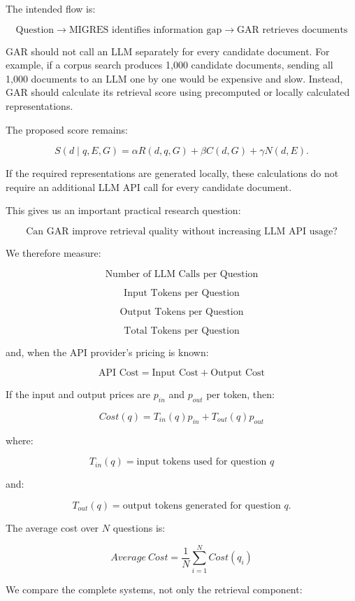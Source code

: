 \documentclass[11pt,a4paper]{article}
\begin{document}
The intended flow is:

\[
\text{Question}
\rightarrow
\text{MIGRES identifies information gap}
\rightarrow
\text{GAR retrieves documents}
\]

GAR should not call an LLM separately for every candidate document. For example, if a corpus search produces 1,000 candidate documents, sending all 1,000 documents to an LLM one by one would be expensive and slow. Instead, GAR should calculate its retrieval score using precomputed or locally calculated representations.

The proposed score remains:

\[
S(d\mid q,E,G)
=
\alpha R(d,q,G)
+
\beta C(d,G)
+
\gamma N(d,E).
\]

If the required representations are generated locally, these calculations do not require an additional LLM API call for every candidate document.

This gives us an important practical research question:

\[
\boxed{
\text{Can GAR improve retrieval quality without increasing LLM API usage?}
}
\]

We therefore measure:

\[
\text{Number of LLM Calls per Question}
\]

\[
\text{Input Tokens per Question}
\]

\[
\text{Output Tokens per Question}
\]

\[
\text{Total Tokens per Question}
\]

and, when the API provider's pricing is known:

\[
\boxed{
\text{API Cost}
=
\text{Input Cost}
+
\text{Output Cost}
}
\tag{11}
\]

If the input and output prices are $p_{in}$ and $p_{out}$ per token, then:

\[
\boxed{
Cost(q)
=
T_{in}(q)p_{in}
+
T_{out}(q)p_{out}
}
\tag{12}
\]

where:

\[
T_{in}(q)=\text{input tokens used for question }q
\]

and:

\[
T_{out}(q)=\text{output tokens generated for question }q.
\]

The average cost over $N$ questions is:

\[
\boxed{
Average\ Cost
=
\frac{1}{N}
\sum_{i=1}^{N} Cost(q_i)
}
\tag{13}
\]

We compare the complete systems, not only the retrieval component:
\end{document}
